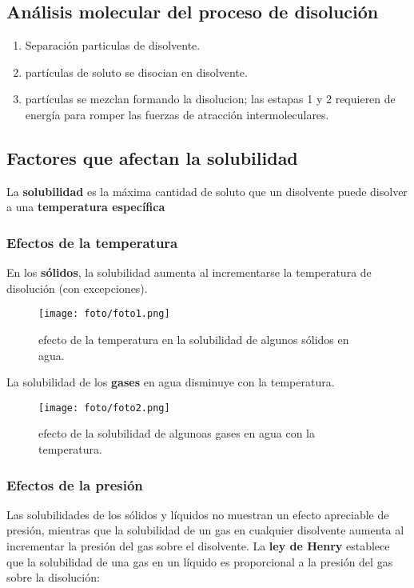 \documentclass[]{article}
\begin{document}
\subsection{Análisis molecular del proceso de disolución}
\begin{enumerate}
	\item Separación particulas de disolvente.
	\item partículas de soluto se disocian en disolvente.
	\item partículas se mezclan formando la disolucion; las estapas 1 y 2 requieren de energía para romper las fuerzas de atracción intermoleculares.
\end{enumerate}


\subsection{Factores que afectan la solubilidad}
La \textbf{solubilidad} es la máxima cantidad de soluto que un disolvente puede disolver a una \textbf{temperatura específica}



\subsubsection{Efectos de la temperatura}
En los \textbf{sólidos}, la solubilidad aumenta al incrementarse la temperatura de disolución (con excepciones). 
 
\begin{figure}[H]
\center
\texttt{[image: foto/foto1.png]}
\caption{efecto de la temperatura en la solubilidad de algunos sólidos en agua.}
\end{figure}

La solubilidad de los \textbf{gases} en agua disminuye con la temperatura.

\begin{figure}[h]
\center
\texttt{[image: foto/foto2.png]}
\caption{efecto de la solubilidad de algunoas gases en agua con la temperatura.}
\end{figure}



\subsubsection{Efectos de la presión}
Las solubilidades de los sólidos y líquidos no muestran un efecto apreciable de presión, mientras que la solubilidad de un gas en cualquier disolvente aumenta al incrementar la presión del gas sobre el disolvente. La \textbf{ley de Henry} establece que la solubilidad de una gas en un líquido es proporcional a la presión del gas sobre la disolución:
\end{document}
